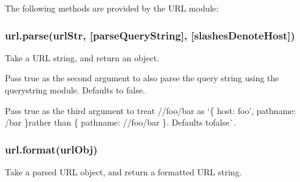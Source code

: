 The following methods are provided by the U\+RL module\+:

\subsubsection*{url.\+parse(url\+Str, \mbox{[}parse\+Query\+String\mbox{]}, \mbox{[}slashes\+Denote\+Host\mbox{]})}

Take a U\+RL string, and return an object.

Pass {\ttfamily true} as the second argument to also parse the query string using the {\ttfamily querystring} module. Defaults to {\ttfamily false}.

Pass {\ttfamily true} as the third argument to treat {\ttfamily //foo/bar} as `\{ host\+: \textquotesingle{}foo', pathname\+: \textquotesingle{}/bar\textquotesingle{} \}{\ttfamily rather than }\{ pathname\+: \textquotesingle{}//foo/bar\textquotesingle{} \}{\ttfamily . Defaults to}false\`{}.

\subsubsection*{url.\+format(url\+Obj)}

Take a parsed U\+RL object, and return a formatted U\+RL string.


